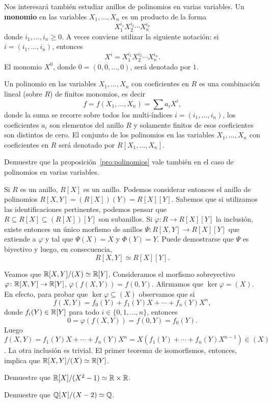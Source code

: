 Nos interesará también estudiar anillos de polinomios en varias variables. Un \textbf{monomio} 
en las variables $X_1,\dots,X_n$ es un producto de la forma
\[
X_1^{i_1}X_2^{i_2}\cdots X_n^{i_n}
\]
donde $i_1,\dots,i_n\geq0$. A veces conviene utilizar la siguiente notación: si $i=(i_1,\dots,i_n)$, entonces 
\[
X^i=X_1^{i_1}X_2^{i_2}\cdots X_n^{i_n}.
\]  
El monomio $X^0$, donde $0=(0,0,\dots,0)$, será denotado por $1$. 

Un polinomio en las variables $X_1,\dots,X_n$ 
con coeficientes en $R$ es una combinación lineal (sobre $R$) de finitos 
monomios, es decir
\[
f=f(X_1,\dots,X_n)=\sum a_iX^i,
\]
donde la suma se recorre sobre todos los multi-índices $i=(i_1,\dots,i_n)$, los coeficientes $a_i$ son elementos del anillo $R$
y solamente finitos de esos coeficientes son distintos de cero. El conjunto de los polinomios en las variables
$X_1,\dots,X_n$ con coeficientes en $R$ será denotado por $R[X_1,\dots,X_n]$. 

\begin{exercise}
Demuestre que 
la proposición~\ref{pro:polinomios} vale también en el caso de polinomios en varias variables.
\end{exercise} 


\begin{example}
Si $R$ es un anillo, $R[X]$ es un anillo. Podemos considerar entonces el anillo de polinomios $R[X,Y]=(R[X])(Y)=R[X][Y]$. 
Sabemos que si utilizamos las identificaciones pertinentes, podemos pensar que $R\subseteq R[X]\subseteq (R[X])[Y]$ son subanillos. Si 
	$\varphi\colon R\to R[X][Y]$ la inclusión, existe entonces un único morfismo de anillos $\Psi\colon R[X,Y]\to R[X][Y]$ que extiende a $\varphi$ y tal que
	$\Psi(X)=X$ y $\Phi(Y)=Y$. Puede demostrarse que $\Psi$ es biyectivo y luego, en consecuencia,
	\[
R[X,Y]\simeq R[X][Y].
\]
\end{example}

\begin{example}
Veamos que $\mathbb{R}[X,Y]/(X)\simeq\mathbb{R}[Y]$. Consideramos el morfismo sobreyectivo $\varphi\colon\mathbb{R}[X,Y]\to\mathbb{R}[Y]$, $\varphi(f(X,Y))=f(0,Y)$. Afirmamos
que $\ker\varphi=(X)$. En efecto, para probar que $\ker\varphi\subseteq (X)$ observamos que si
\[
f(X,Y)=f_0(Y)+f_1(Y)X+\cdots+f_n(Y)X^n,
\]
donde $f_i(Y)\in\mathbb{R}[Y]$ para todo $i\in\{0,1,\dots,n\}$, entonces 
\[
0=\varphi(f(X,Y))=f(0,Y)=f_0(Y).
\] 
Luego $f(X,Y)=f_1(Y)X+\cdots+f_n(Y)X^n=X(f_1(Y)+\cdots+f_n(Y)X^{n-1})\in (X)$. La otra inclusión es trivial. 
El primer teorema de isomorfismos, entonces, implica que $\mathbb{R}[X,Y]/(X)\simeq\mathbb{R}[Y]$.  
\end{example}

\begin{exercise}
Demuestre que $\mathbb{R}[X]/(X^2-1)\simeq\mathbb{R}\times\mathbb{R}$.	
\end{exercise}

\begin{exercise}
Demuestre que $\mathbb{Q}[X]/(X-2)\simeq\mathbb{Q}$. 	
\end{exercise}
	
